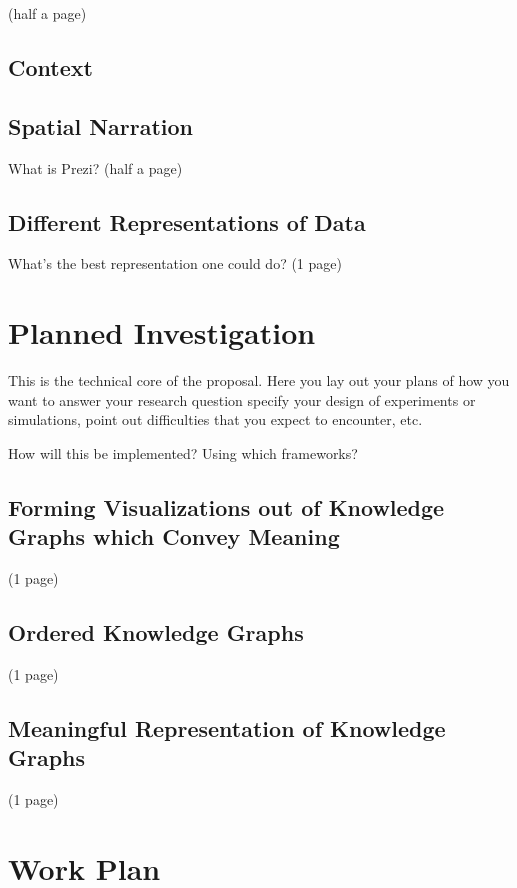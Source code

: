 \documentclass[twoside]{article}
\begin{document}
(half a page)
\vspace*{8cm}

\subsection{Context}

\subsection{Spatial Narration}
What is Prezi?
(half a page)
\vspace*{8cm}
\subsection{Different Representations of Data}
What's the best representation one could do?
(1 page)


\section{Planned Investigation}

  This is the technical core of the proposal. Here you lay out your
  plans of how you want to answer your research question specify your
  design of experiments or simulations, point out difficulties that
  you expect to encounter, etc.

How will this be implemented?
Using which frameworks?
  

\subsection{Forming Visualizations out of Knowledge Graphs which Convey Meaning}
(1 page)
\newpage

\subsection{Ordered Knowledge Graphs}
(1 page)
\newpage

\subsection{Meaningful Representation of Knowledge Graphs}
(1 page)

\newpage

\section{Work Plan}
\end{document}

